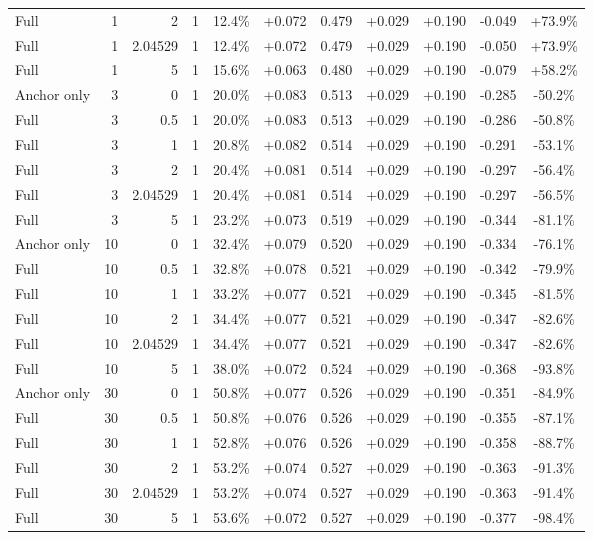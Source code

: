 \begin{table}[htbp]
\begin{tabular}{lrrrccccccc}
Full & 1 & 2 & 1 & 12.4\% & +0.072 & 0.479 & +0.029 & +0.190 & -0.049 & +73.9\% \\
Full & 1 & 2.04529 & 1 & 12.4\% & +0.072 & 0.479 & +0.029 & +0.190 & -0.050 & +73.9\% \\
Full & 1 & 5 & 1 & 15.6\% & +0.063 & 0.480 & +0.029 & +0.190 & -0.079 & +58.2\% \\
Anchor only & 3 & 0 & 1 & 20.0\% & +0.083 & 0.513 & +0.029 & +0.190 & -0.285 & -50.2\% \\
Full & 3 & 0.5 & 1 & 20.0\% & +0.083 & 0.513 & +0.029 & +0.190 & -0.286 & -50.8\% \\
Full & 3 & 1 & 1 & 20.8\% & +0.082 & 0.514 & +0.029 & +0.190 & -0.291 & -53.1\% \\
Full & 3 & 2 & 1 & 20.4\% & +0.081 & 0.514 & +0.029 & +0.190 & -0.297 & -56.4\% \\
Full & 3 & 2.04529 & 1 & 20.4\% & +0.081 & 0.514 & +0.029 & +0.190 & -0.297 & -56.5\% \\
Full & 3 & 5 & 1 & 23.2\% & +0.073 & 0.519 & +0.029 & +0.190 & -0.344 & -81.1\% \\
Anchor only & 10 & 0 & 1 & 32.4\% & +0.079 & 0.520 & +0.029 & +0.190 & -0.334 & -76.1\% \\
Full & 10 & 0.5 & 1 & 32.8\% & +0.078 & 0.521 & +0.029 & +0.190 & -0.342 & -79.9\% \\
Full & 10 & 1 & 1 & 33.2\% & +0.077 & 0.521 & +0.029 & +0.190 & -0.345 & -81.5\% \\
Full & 10 & 2 & 1 & 34.4\% & +0.077 & 0.521 & +0.029 & +0.190 & -0.347 & -82.6\% \\
Full & 10 & 2.04529 & 1 & 34.4\% & +0.077 & 0.521 & +0.029 & +0.190 & -0.347 & -82.6\% \\
Full & 10 & 5 & 1 & 38.0\% & +0.072 & 0.524 & +0.029 & +0.190 & -0.368 & -93.8\% \\
Anchor only & 30 & 0 & 1 & 50.8\% & +0.077 & 0.526 & +0.029 & +0.190 & -0.351 & -84.9\% \\
Full & 30 & 0.5 & 1 & 50.8\% & +0.076 & 0.526 & +0.029 & +0.190 & -0.355 & -87.1\% \\
Full & 30 & 1 & 1 & 52.8\% & +0.076 & 0.526 & +0.029 & +0.190 & -0.358 & -88.7\% \\
Full & 30 & 2 & 1 & 53.2\% & +0.074 & 0.527 & +0.029 & +0.190 & -0.363 & -91.3\% \\
Full & 30 & 2.04529 & 1 & 53.2\% & +0.074 & 0.527 & +0.029 & +0.190 & -0.363 & -91.4\% \\
Full & 30 & 5 & 1 & 53.6\% & +0.072 & 0.527 & +0.029 & +0.190 & -0.377 & -98.4\% \\

\end{tabular}
\end{table}

